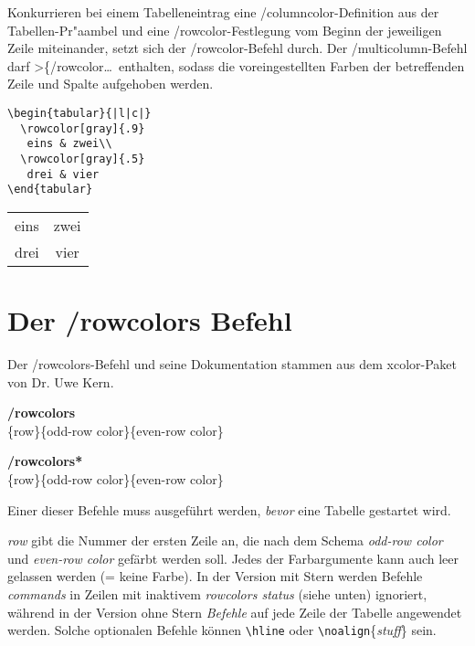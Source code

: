 \documentclass[ngerman]{article}
\begin{document}
Konkurrieren bei einem Tabelleneintrag eine \slash \textsf{columncolor}-Definition aus der
Tabellen-Pr"aambel und eine \slash \textsf{rowcolor}-Festlegung vom Beginn der jeweiligen 
Zeile miteinander, setzt sich der \slash \textsf{rowcolor}-Befehl durch. Der 
\slash \textsf{multicolumn}-Befehl darf >\{\slash \textsf{rowcolor}\ldots\ enthalten, 
sodass die voreingestellten Farben der betreffenden Zeile und Spalte aufgehoben werden.
\begin{center}
\begin{minipage}{.75\textwidth}
\begin{verbatim}
\begin{tabular}{|l|c|}
  \rowcolor[gray]{.9}
   eins & zwei\\
  \rowcolor[gray]{.5}
   drei & vier
\end{tabular}
\end{verbatim}
\end{minipage}
 {\bfseries
  \begin{tabular}{|l|c|}
  \rowcolor[gray]{.9}
  eins & zwei\\
  \rowcolor[gray]{.5}
  drei & vier
  \end{tabular}}
 \end{center}


\section{Der \slash \textsf{rowcolors} Befehl}
Der \slash \textsf{rowcolors}-Befehl und seine Dokumentation stammen aus dem \textsf{xcolor}-Paket
von Dr. Uwe Kern.

\textbf{\slash rowcolors}\\\relax
  [commands]\{row\}\{odd-row color\}\{even-row color\}

\textbf{\slash rowcolors*}\\\relax
  [commands]\{row\}\{odd-row color\}\{even-row color\}

Einer dieser Befehle muss ausgeführt werden, \emph{bevor} eine Tabelle gestartet wird.

\emph{row} gibt die Nummer der ersten Zeile an, die nach dem Schema \emph{odd-row color} und \emph{even-row color} gefärbt werden soll.
Jedes der Farbargumente kann auch leer gelassen werden (= keine Farbe).
In der Version mit Stern werden Befehle \emph{commands} in Zeilen mit inaktivem \emph{rowcolors status} (siehe unten) ignoriert, während in der Version ohne Stern \emph{Befehle} auf jede Zeile der Tabelle angewendet werden.
Solche optionalen Befehle können \verb"\hline" oder \verb"\noalign"\{\emph{stuff}\} sein.
\end{document}
